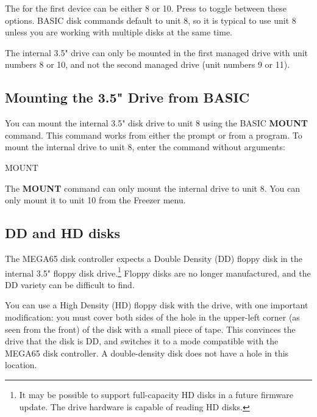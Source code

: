 The  for the first device can be either 8 or 10. Press  to toggle between these options. BASIC disk commands default to unit 8, so it is typical to use unit 8 unless you are working with multiple disks at the same time.

The internal 3.5" drive can only be mounted in the first managed drive with unit numbers 8 or 10, and not the second managed drive (unit numbers 9 or 11).

\subsection{Mounting the 3.5" Drive from BASIC}

You can mount the internal 3.5" disk drive to unit 8 using the BASIC {\bf MOUNT} command. This command works from either the  prompt or from a program. To mount the internal drive to unit 8, enter the command without arguments:

\begin{screenoutput}
MOUNT
\end{screenoutput}

The {\bf MOUNT} command can only mount the internal drive to unit 8. You can only mount it to unit 10 from the Freezer menu.

\subsection{DD and HD disks}

The MEGA65 disk controller expects a Double Density (DD) floppy disk in the internal 3.5" floppy disk drive.\footnote{It may be possible to support full-capacity HD disks in a future firmware update. The drive hardware is capable of reading HD disks.} Floppy disks are no longer manufactured, and the DD variety can be difficult to find.

You can use a High Density (HD) floppy disk with the drive, with one important modification: you must cover both sides of the hole in the upper-left corner (as seen from the front) of the disk with a small piece of tape. This convinces the drive that the disk is DD, and switches it to a mode compatible with the MEGA65 disk controller. A double-density disk does not have a hole in this location.

